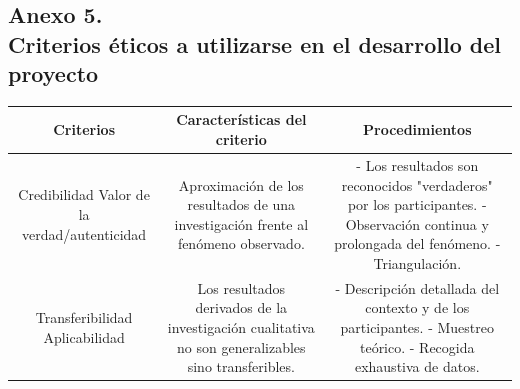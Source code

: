 \documentclass[12pt, a4paper, nofontenc, numbers=endperiod]{apa7}
\begin{document}
{\newpage
\subsection*{\normalsize \centering Anexo 5. \\ Criterios éticos a utilizarse en el desarrollo del proyecto}
\vspace*{-1cm}
\begin{table}[h]
	{\renewcommand{\arraystretch}{0.1}	
		{\singlespacing
			\begin{tabular}{|c|c|c|}
				\hline
				\multicolumn{1}{|p{4.50cm}|}{\vspace*{0.2mm}\centering \textbf{Criterios}} & \multicolumn{1}{p{4.50cm}|}{ \centering \textbf{Características del criterio}}& \multicolumn{1}{p{4.50cm}|}{\vspace*{0.2mm}\centering \textbf{Procedimientos}} \\
				\hline
				\multicolumn{1}{|p{4.50cm}|}{\vspace*{3mm}\centering \hspace*{0.5cm}Credibilidad \newline \newline Valor de la verdad/autenticidad} &  \multicolumn{1}{p{4.50cm}|}{\vspace*{0.1mm}Aproximación de los resultados de una investigación frente al fenómeno observado.}& \multicolumn{1}{p{4.50cm}|}{- Los resultados son reconocidos "verdaderos" por los participantes.\newline
					- Observación continua y prolongada del fenómeno. \newline
					- Triangulación.} \\
				
				\hline
				\multicolumn{1}{|p{4.50cm}|}{\vspace*{5mm}\centering \hspace*{0.3cm} Transferibilidad \newline \newline Aplicabilidad} &  \multicolumn{1}{p{5cm}|}{\vspace*{0.1mm}Los resultados derivados de la investigación cualitativa no son generalizables sino transferibles.} & \multicolumn{1}{p{5cm}|}{- Descripción detallada del contexto y de los participantes. \newline - Muestreo teórico. \newline - Recogida exhaustiva de datos.} \\
				

\end{tabular}}}
\end{table}}
\end{document}

